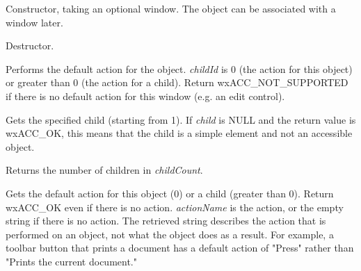 
Constructor, taking an optional window. The object can be associated with
a window later.

\label{wxaccessibledtor}


Destructor.

\label{wxaccessibledodefaultaction}


Performs the default action for the object. {\it childId} is 0 (the action for this object)
or greater than 0 (the action for a child). Return wxACC\_NOT\_SUPPORTED if there
is no default action for this window (e.g. an edit control).

\label{wxaccessiblegetchild}


Gets the specified child (starting from 1). If {\it child} is NULL and the return value is wxACC\_OK,
this means that the child is a simple element and not an accessible object.

\label{wxaccessiblegetchildcount}


Returns the number of children in {\it childCount}.

\label{wxaccessiblegetdefaultaction}


Gets the default action for this object (0) or a child (greater than 0).
Return wxACC\_OK even if there is no action. {\it actionName} is the action, or the empty
string if there is no action. The retrieved string describes the action that is performed on an object,
not what the object does as a result. For example, a toolbar button that prints
a document has a default action of "Press" rather than "Prints the current document."

\label{wxaccessiblegetdescription}

